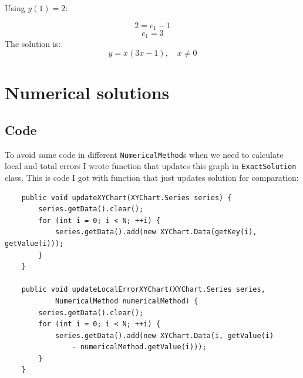 \documentclass{article}
\begin{document}
Using $y(1) = 2$:

	$$2 = c_1 - 1$$
	$$c_1 = 3$$
The solution is:
	$$y = x(3x - 1), \quad x \neq 0$$

\section{Numerical solutions}

\subsection{Code}
To avoid same code in different \texttt{NumericalMethod}s when we need to calculate local and total errors
I wrote function that updates this graph in \texttt{ExactSolution} class. This is code I got with function 
that just updates solution for comparation: 


\begin{verbatim}
    public void updateXYChart(XYChart.Series series) {
        series.getData().clear();
        for (int i = 0; i < N; ++i) {
            series.getData().add(new XYChart.Data(getKey(i), getValue(i)));
        }
    }

    public void updateLocalErrorXYChart(XYChart.Series series, 
    		NumericalMethod numericalMethod) {
        series.getData().clear();
        for (int i = 0; i < N; ++i) {
            series.getData().add(new XYChart.Data(i, getValue(i)
            	- numericalMethod.getValue(i)));
        }
    }

\end{verbatim}
\end{document}
